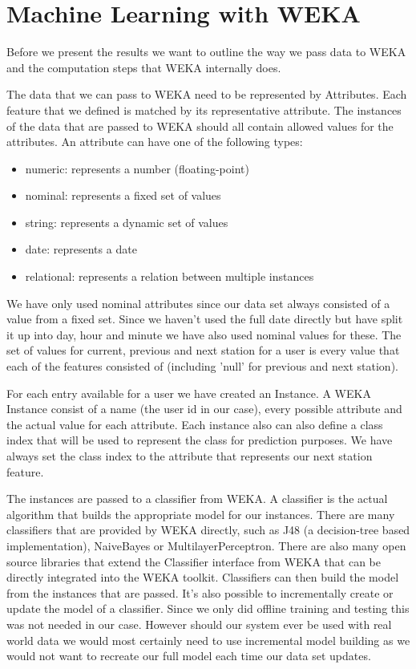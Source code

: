 \section{Machine Learning with WEKA}
Before we present the results we want to outline the way we pass data to WEKA and the computation steps that WEKA internally does.

The data that we can pass to WEKA need to be represented by Attributes. Each feature that we defined is matched by its representative attribute. The instances of the data that are passed to WEKA should all contain allowed values for the attributes. An attribute can have one of the following types: \cite{WEKAJavaDocAttribute}
\begin{itemize}
	\item numeric: represents a number (floating-point)
	\item nominal: represents a fixed set of values
	\item string: represents a dynamic set of values
	\item date: represents a date
	\item relational: represents a relation between multiple instances
\end{itemize}


We have only used nominal attributes since our data set always consisted of a value from a fixed set. Since we haven't used the full date directly but have split it up into day, hour and minute we have also used nominal values for these. The set of values for current, previous and next station for a user is every value that each of the features consisted of (including 'null' for previous and next station).

For each entry available for a user we have created an Instance. A WEKA Instance consist of a name (the user id in our case), every possible attribute and the actual value for each attribute. Each instance also can also define a class index that will be used to represent the class for prediction purposes. We have always set the class index to the attribute that represents our next station feature.

The instances are passed to a classifier from WEKA. A classifier is the actual algorithm that builds the appropriate model for our instances. There are many classifiers that are provided by WEKA directly, such as J48 (a decision-tree based implementation), NaiveBayes or MultilayerPerceptron. There are also many open source libraries that extend the Classifier interface from WEKA that can be directly integrated into the WEKA toolkit. Classifiers can then build the model from the instances that are passed. It's also possible to incrementally create or update the model of a classifier. Since we only did offline training and testing this was not needed in our case. However should our system ever be used with real world data we would most certainly need to use incremental model building as we would not want to recreate our full model each time our data set updates.

